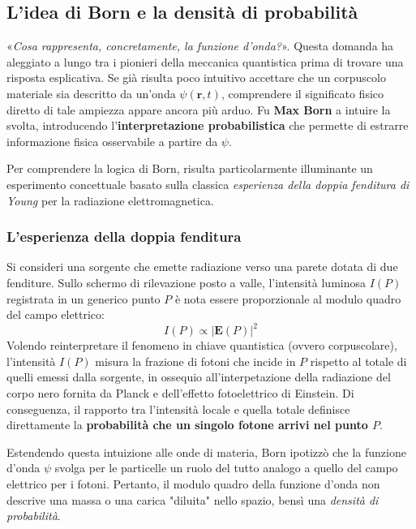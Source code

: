 \subsection{L'idea di Born e la densità di probabilità}
«\emph{Cosa rappresenta, concretamente, la funzione d'onda?}». Questa domanda ha aleggiato a lungo tra i pionieri della meccanica quantistica prima di trovare una risposta esplicativa. Se già risulta poco intuitivo accettare che un corpuscolo materiale sia descritto da un'onda $\psi(\bm{r},t)$, comprendere il significato fisico diretto di tale ampiezza appare ancora più arduo. Fu \textbf{Max Born} a intuire la svolta, introducendo l'\textbf{interpretazione probabilistica} che permette di estrarre informazione fisica osservabile a partire da $\psi$.

Per comprendere la logica di Born, risulta particolarmente illuminante un esperimento concettuale basato sulla classica \emph{esperienza della doppia fenditura di Young} per la radiazione elettromagnetica. 

\subsubsection{L'esperienza della doppia fenditura}
Si consideri una sorgente che emette radiazione verso una parete dotata di due fenditure. Sullo schermo di rilevazione posto a valle, l'intensità luminosa $I(P)$ registrata in un generico punto $P$ è nota essere proporzionale al modulo quadro del campo elettrico:
\begin{equation*}
    I(P) \propto |\bm{E}(P)|^2
\end{equation*}
Volendo reinterpretare il fenomeno in chiave quantistica (ovvero corpuscolare), l'intensità $I(P)$ misura la frazione di fotoni che incide in $P$ rispetto al totale di quelli emessi dalla sorgente, in ossequio all'interpetazione della radiazione del corpo nero fornita da Planck e dell'effetto fotoelettrico di Einstein. Di conseguenza, il rapporto tra l'intensità locale e quella totale definisce direttamente la \textbf{probabilità che un singolo fotone arrivi nel punto $P$}.

Estendendo questa intuizione alle onde di materia, Born ipotizzò che la funzione d'onda $\psi$ svolga per le particelle un ruolo del tutto analogo a quello del campo elettrico per i fotoni. Pertanto, il modulo quadro della funzione d'onda non descrive una massa o una carica "diluita" nello spazio, bensì una \textit{densità di probabilità}.    

